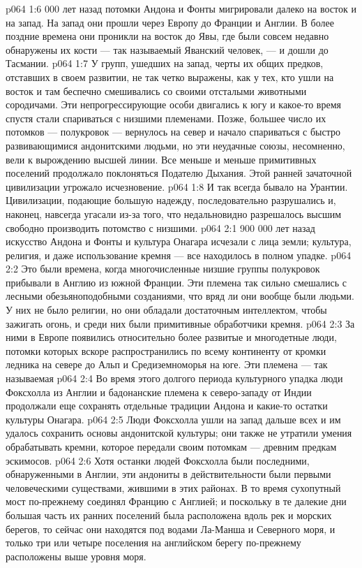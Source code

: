 \vs p064 1:6  000 лет назад потомки Андона и Фонты мигрировали далеко на восток и на запад. На запад они прошли через Европу до Франции и Англии. В более поздние времена они проникли на восток до Явы, где были совсем недавно обнаружены их кости --- так называемый Яванский человек, --- и дошли до Тасмании.
\vs p064 1:7 У групп, ушедших на запад, черты их общих предков, отставших в своем развитии, не так четко выражены, как у тех, кто ушли на восток и там беспечно смешивались со своими отсталыми животными сородичами. Эти непрогрессирующие особи двигались к югу и какое\hyp{}то время спустя стали спариваться с низшими племенами. Позже, большее число их потомков --- полукровок --- вернулось на север и начало спариваться с быстро развивающимися андонитскими людьми, но эти неудачные союзы, несомненно, вели к вырождению высшей линии. Все меньше и меньше примитивных поселений продолжало поклоняться Подателю Дыхания. Этой ранней зачаточной цивилизации угрожало исчезновение.
\vs p064 1:8 И так всегда бывало на Урантии. Цивилизации, подающие большую надежду, последовательно разрушались и, наконец, навсегда угасали из\hyp{}за того, что недальновидно разрешалось высшим свободно производить потомство с низшими.
\vs p064 2:1 900 000 лет назад искусство Андона и Фонты и культура Онагара исчезали с лица земли; культура, религия, и даже использование кремня --- все находилось в полном упадке.
\vs p064 2:2 Это были времена, когда многочисленные низшие группы полукровок прибывали в Англию из южной Франции. Эти племена так сильно смешались с лесными обезьяноподобными созданиями, что вряд ли они вообще были людьми. У них не было религии, но они обладали достаточным интеллектом, чтобы зажигать огонь, и среди них были примитивные обработчики кремня.
\vs p064 2:3 За ними в Европе появились относительно более развитые и многодетные люди, потомки которых вскоре распространились по всему континенту от кромки ледника на севере до Альп и Средиземноморья на юге. Эти племена --- так называемая 
\vs p064 2:4 Во время этого долгого периода культурного упадка люди Фоксхолла из Англии и бадонанские племена к северо\hyp{}западу от Индии продолжали еще сохранять отдельные традиции Андона и какие\hyp{}то остатки культуры Онагара.
\vs p064 2:5 \pc Люди Фоксхолла ушли на запад дальше всех и им удалось сохранить основы андонитской культуры; они также не утратили умения обрабатывать кремни, которое передали своим потомкам --- древним предкам эскимосов.
\vs p064 2:6 Хотя останки людей Фоксхолла были последними, обнаруженными в Англии, эти андониты в действительности были первыми человеческими существами, жившими в этих районах. В то время сухопутный мост по\hyp{}прежнему соединял Францию с Англией; и поскольку в те далекие дни большая часть их ранних поселений была расположена вдоль рек и морских берегов, то сейчас они находятся под водами Ла\hyp{}Манша и Северного моря, и только три или четыре поселения на английском берегу по\hyp{}прежнему расположены выше уровня моря.
